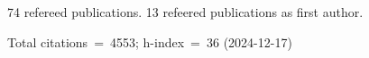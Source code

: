 74 refereed publications. 13 refeered publications as first author.

Total citations~=~4553; h-index~=~36 (2024-12-17)